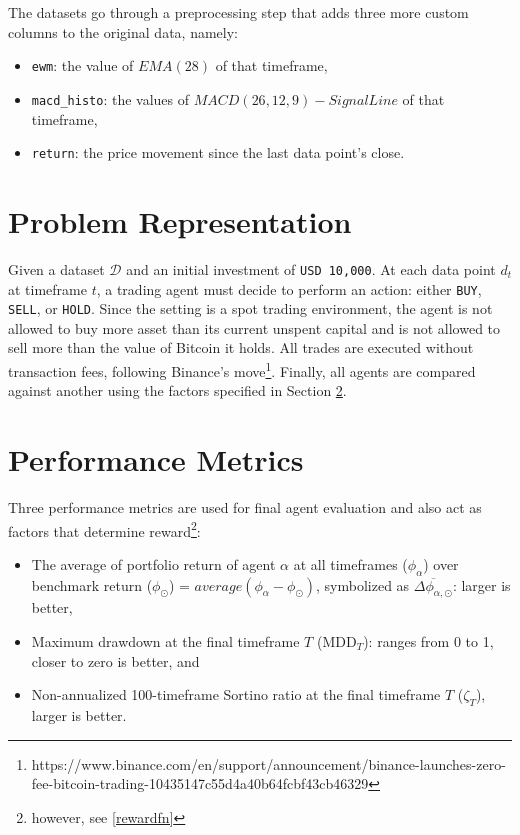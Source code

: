 The datasets go through a preprocessing step that adds three more custom columns to the original data, namely:
\begin{itemize}
	\item \texttt{ewm}: the value of $EMA(28)$ of that timeframe,
	\item \texttt{macd\_histo}: the values of $MACD(26,12,9) - SignalLine$ of that timeframe,
	\item \texttt{return}: the price movement since the last data point's close.
\end{itemize}

\section{Problem Representation}
Given a dataset $\mathcal{D}$ and an initial investment of \texttt{USD 10,000}. At each data point $d_t$ at timeframe $t$, a trading agent must decide to perform an action: either \texttt{BUY}, \texttt{SELL}, or \texttt{HOLD}. Since the setting is a spot trading environment, the agent is not allowed to buy more asset than its current unspent capital and is not allowed to sell more than the value of Bitcoin it holds. All trades are executed without transaction fees, following Binance's move\footnote{https://www.binance.com/en/support/announcement/binance-launches-zero-fee-bitcoin-trading-10435147c55d4a40b64fcbf43cb46329}. Finally, all agents are compared against another using the factors specified in Section \ref{sec:performancemx}.

\section{Performance Metrics}
\label{sec:performancemx}
Three performance metrics are used for final agent evaluation and also act as factors that determine reward\footnote{however, see \ref{rewardfn}}:
\begin{itemize}
	\item The average of portfolio return of agent $\alpha$ at all timeframes ($\phi_\alpha$) over benchmark return ($\phi_\odot$) = $average(\phi_\alpha - \phi_\odot)$, symbolized as $\overline{\Delta\phi_{\alpha,\odot}}$: larger is better,
	\item Maximum drawdown at the final timeframe $T$ (MDD$_T$): ranges from 0 to 1, closer to zero is better, and
	\item Non-annualized 100-timeframe Sortino ratio at the final timeframe $T$ ($\zeta_T$), larger is better.
\end{itemize}

